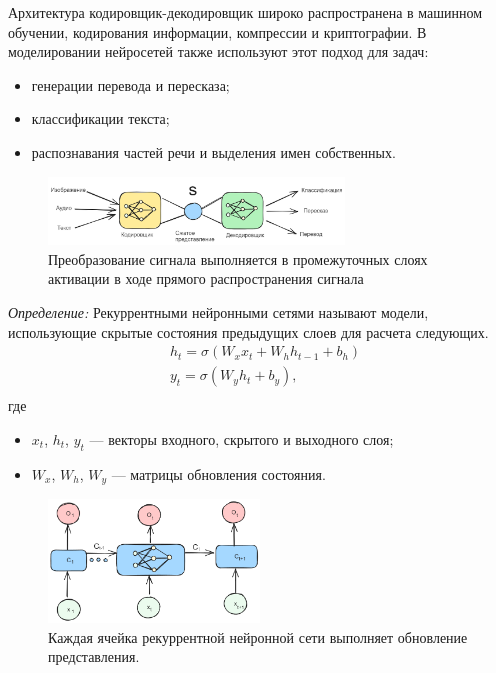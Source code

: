 Архитектура кодировщик-декодировщик широко распространена в машинном обучении, кодирования информации, компрессии и
криптографии. В моделировании нейросетей также используют этот подход для задач:
 \begin{itemize}
    \item генерации перевода и пересказа;
    \item классификации текста;
    \item распознавания частей речи и выделения имен собственных.
\end{itemize}

\begin{figure}[h]
    \centering
    \includegraphics[width=0.7\textwidth]{assets/ml/nn/encoder_decoder.excalidraw.png}
    \caption{Преобразование сигнала выполняется в промежуточных слоях активации в ходе прямого распространения сигнала}
    \label{encoder}
\end{figure}

\textit{Определение:} Рекуррентными нейронными сетями называют модели, использующие скрытые состояния 
предыдущих слоев для расчета следующих.
\begin{equation}
    \begin{aligned}
        & h_t = \sigma (W_x x_t + W_h h_{t-1}+ b_h) \\
        & y_t = \sigma (W_y h_t + b_y), \\
    \end{aligned}
\end{equation}
где \begin{itemize}
    \item $x_t$, $h_t$, $y_t$ --- векторы входного, скрытого и выходного слоя;
    \item $W_x$, $W_h$, $W_y$ --- матрицы обновления состояния.
\end{itemize}
\begin{figure}[h]
    \centering
    \includegraphics[width=0.5\textwidth]{assets/ml/nn/rnn.excalidraw.png}
    \caption{Каждая ячейка рекуррентной нейронной сети выполняет обновление представления.}
    \label{reccurent}
\end{figure}

